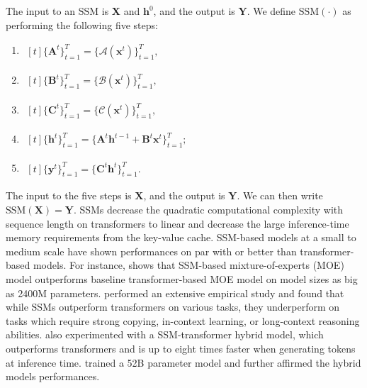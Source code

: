 \documentclass{article}
\newcommand{\A}{\mathcal{A}}
\newcommand{\B}{\mathcal{B}}
\newcommand{\C}{\mathcal{C}}
\newcommand{\ssm}{\mathrm{SSM}}
\newcommand{\ka}[1]{{\color{brown} Kavosh: #1 }}
\newcommand{\xx}[1]{{\color{cyan} Xingzi: #1 }}
\begin{document}
The input to an $\ssm$ is $\mathbf{X}$ and $\mathbf{h}^0$, and the output is $\mathbf{Y}$. We define $\ssm(\cdot)$ as performing the following five steps:
\begin{enumerate}
\item $\begin{aligned}[t]
    \{\mathbf{A}^t\}_{t=1}^T = \{\boldsymbol{\A}(\mathbf{x}^t)\}_{t=1}^T,
\end{aligned}$
\item $\begin{aligned}[t]
    \{\mathbf{B}^t\}_{t=1}^T = \{\boldsymbol{\B}(\mathbf{x}^t)\}_{t=1}^T,
\end{aligned}$
\item $\begin{aligned}[t]
    \{\mathbf{C}^t\}_{t=1}^T = \{\boldsymbol{\C}(\mathbf{x}^t)\}_{t=1}^T,
\end{aligned}$
\item $\begin{aligned}[t]
    \{\mathbf{h}^t\}_{t=1}^{T} = \{\mathbf{A}^t\mathbf{h}^{t-1}+\mathbf{B}^t\mathbf{x}^t\}_{t=1}^T;
\end{aligned}$
\item $\begin{aligned}[t]
    \{\mathbf{y}^t\}_{t=1}^{T} = \{\mathbf{C}^t\mathbf{h}^t\}_{t=1}^T.
\end{aligned}$
\end{enumerate}

The input to the five steps is $\mathbf{X}$, and the output is $\mathbf{Y}$. We can then write $\ssm(\mathbf{X})=\mathbf{Y}$.
SSMs decrease the quadratic computational complexity with sequence length on transformers to linear and decrease the large inference-time memory requirements from the key-value cache. SSM-based models at a small to medium scale have shown performances on par with or better than transformer-based models. For instance, \citep{pióro2024moemambaefficientselectivestate, anthony2024blackmambamixtureexpertsstatespace} shows that SSM-based mixture-of-experts (MOE) model outperforms baseline transformer-based MOE model on model sizes as big as 2400M parameters. \citep{waleffe2024empiricalstudymambabasedlanguage} performed an extensive empirical study and found that while SSMs outperform transformers on various tasks, they underperform on tasks which require strong copying, in-context learning, or long-context reasoning abilities. \citep{waleffe2024empiricalstudymambabasedlanguage} also experimented with a SSM-transformer hybrid model, which outperforms transformers and is up to eight times faster when generating tokens at inference time. \citep{lieber2024jambahybridtransformermambalanguage} trained a 52B parameter model and further affirmed the hybrid models performances. 
\end{document}
